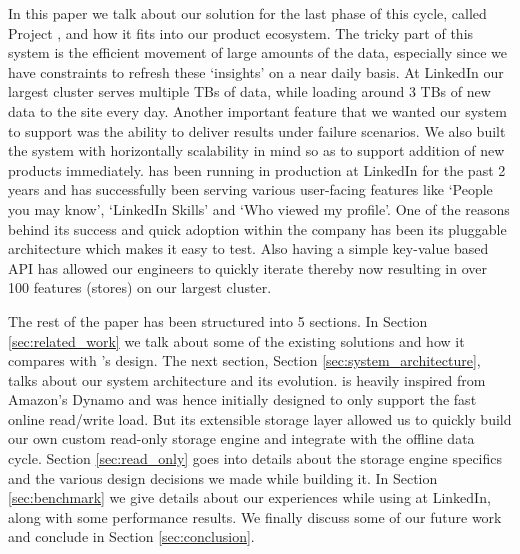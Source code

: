 \documentclass[10pt,twocolumn,preprint,natbib,authoryear]{sigplanconf}
\begin{document}
In this paper we talk about our solution for the last phase of this cycle, called Project \projectname{}, and how it fits into our product ecosystem. The tricky part of this system is the efficient movement of large amounts of the data, especially since we have constraints to refresh these `insights' on a near daily basis. At LinkedIn our largest cluster serves multiple TBs of data, while loading around 3 TBs of new data to the site every day. Another important feature that we wanted our system to support was the ability to deliver results under failure scenarios. We also built the system with horizontally scalability in mind so as to support addition of new products immediately. \projectname{} has been running in production at LinkedIn for the past 2 years and has successfully been serving various user-facing features like `People you may know', `LinkedIn Skills' and `Who viewed my profile'. One of the reasons behind its success and quick adoption within the company has been its pluggable architecture which makes it easy to test. Also having a simple key-value based API has allowed our engineers to quickly iterate thereby now resulting in over 100 features (stores) on our largest cluster.

The rest of the paper has been structured into 5 sections. In Section \ref{sec:related_work} we talk about some of the existing solutions and how it compares with \projectname{}'s design. The next section, Section \ref{sec:system_architecture},  talks about our system architecture and its evolution. \projectname{} is heavily inspired from Amazon's Dynamo\cite{dynamo} and was hence initially designed to only support the fast online read/write load. But its extensible storage layer allowed us to quickly build our own custom read-only storage engine and integrate with the offline data cycle. Section \ref{sec:read_only} goes into details about the storage engine specifics and the various design decisions we made while building it. In Section \ref{sec:benchmark} we give details about our experiences while using \projectname{} at LinkedIn, along with some performance results. We finally discuss some of our future work and conclude in Section \ref{sec:conclusion}. 

\end{document}
